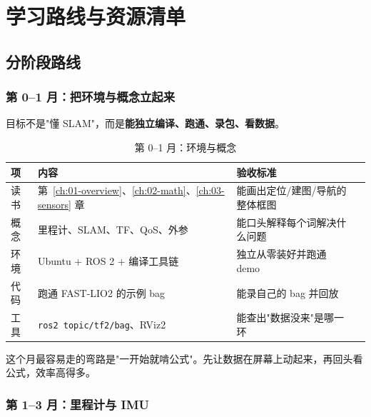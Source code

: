 \chapter{学习路线与资源清单}\label{ch:30-roadmap}


\section{分阶段路线}\label{sec:30-stages}

\subsection{第 0--1 月：把环境与概念立起来}

目标不是"懂 SLAM"，而是\textbf{能独立编译、跑通、录包、看数据}。

\begin{table}[htbp]
  \centering
  \caption{第 0--1 月：环境与概念}\label{tab:30-s1}
  \small
  \begin{tabular}{lp{3.4cm}p{3.6cm}p{3.6cm}}
    \toprule
    项 & 内容 & 验收标准 \\
    \midrule
    读书 & 第~\ref{ch:01-overview}、\ref{ch:02-math}、\ref{ch:03-sensors} 章 & 能画出定位/建图/导航的整体框图 \\
    概念 & 里程计、SLAM、TF、QoS、外参 & 能口头解释每个词解决什么问题 \\
    环境 & Ubuntu + ROS 2 + 编译工具链 & 独立从零装好并跑通 demo \\
    代码 & 跑通 FAST-LIO2 的示例 bag & 能录自己的 bag 并回放 \\
    工具 & \lstinline{ros2 topic/tf2/bag}、RViz2 & 能查出"数据没来"是哪一环 \\
    \bottomrule
  \end{tabular}
\end{table}

这个月最容易走的弯路是"一开始就啃公式"。先让数据在屏幕上动起来，再回头看公式，效率高得多。

\subsection{第 1--3 月：里程计与 IMU}

